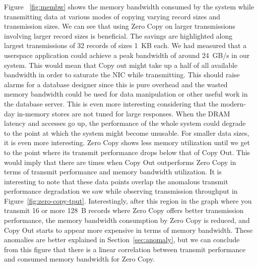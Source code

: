 Figure ~\ref{fig:membw} shows the memory bandwidth consumed by the system while transmitting data at various modes 
of copying varying record sizes and transmission sizes. We can see that using Zero Copy on larger transmissions involving 
larger record sizes is beneficial. The savings are highlighted along largest transmissions of 32 records of sizes 1~KB each. 
 We had measured that a userspace application could achieve a peak bandwidth of around 24~GB/s in our system. This would mean that Copy out 
 might take up a half of all available bandwidth in order to saturate the NIC while transmitting. This should raise alarms for a database 
 designer since this is pure overhead and the wasted memory bandwidth could be used for data manipulation or other useful work in the database 
 server. This is even more interesting considering that the modern-day in-memory stores are not tuned for large responses.
  When the DRAM latency and accesses go up, the performance of the whole system could degrade to the point at which the system might become unusable.
For smaller data sizes, it is even more interesting. Zero Copy shows less memory utilization until we get to the point where its transmit performance 
drops below that of Copy Out. This would imply that there are times when Copy Out outperforms Zero Copy in terms of transmit performance and 
memory bandwidth utilization. It is interesting to note that these data points overlap the anomalous transmit performance 
degradation we saw while observing transmission throughput in Figure~\ref{fig:zero-copy-tput}. Interestingly, after this region in the graph 
where you transmit 16 or more 128~B records where Zero Copy offers better transmission performance, the memory bandwidth consumption by Zero Copy 
is reduced, and Copy Out starts to appear more expensive in terms of memory bandwidth. These anomalies are better explained in Section~\ref{sec:anomaly}, but we 
can conclude from this figure that there is a linear correlation between transmit performance and consumed memory bandwidth for Zero Copy.
\newline


